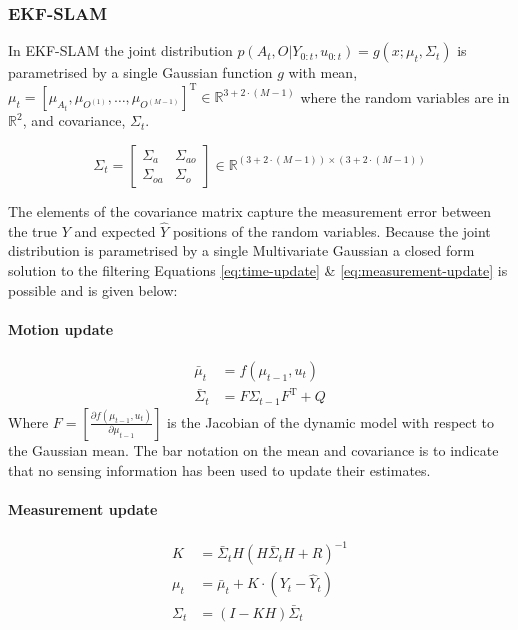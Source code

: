 \documentclass[review]{elsarticle}
\numberwithin{equation}{section}
\begin{document}
\subsubsection{EKF-SLAM}\label{sec:EKF-SLAM}

In EKF-SLAM the joint distribution $p(A_{t},O|Y_{0:t},u_{0:t}) = g(x;\mu_t,\Sigma_t)$ is parametrised by a single Gaussian function $g$ with mean,
$\mu_t = \left[\mu_{A_{t}},\mu_{O^{(1)}},\dots,\mu_{O^{(M-1)}}\right]^{\mathrm{T}} \in \mathbb{R}^{3 + 2\cdot (M-1)}$  where the random variables 
are in $\mathbb{R}^2$, and covariance, $\Sigma_t$. 

\begin{equation}
\Sigma_t = \begin{bmatrix}
       \Sigma_a & \Sigma_{ao}  \\[0.3em]
       \Sigma_{oa} & \Sigma_o
     \end{bmatrix}
     \in \mathbb{R}^{(3 + 2\cdot (M-1)) \times (3 + 2\cdot (M-1))}
\end{equation}

The elements of the covariance matrix capture the measurement error between the true $Y$ and expected $\hat{Y}$ 
positions of the random variables. Because the joint distribution is parametrised by a single Multivariate Gaussian a closed 
form solution to the filtering Equations \ref{eq:time-update} \& \ref{eq:measurement-update} is possible and is given below:

\paragraph{Motion update}
\begin{align}
  \bar{\mu}_t      &= f(\mu_{t-1},u_t)\\
  \bar{\Sigma}_{t} &= F \Sigma_{t-1} F^{\mathrm{T}} + Q
\end{align}
Where $F = \left[\frac{\partial f(\mu_{t-1},u_t)}{\partial \mu_{t-1} } \right]$ is the Jacobian of the dynamic model with respect to the Gaussian mean. The 
bar notation on the mean and covariance is to indicate that no sensing information has been used to update their estimates.

\paragraph{Measurement update}

\begin{align}
   K    &= \bar{\Sigma}_{t} H (H \bar{\Sigma}_{t} H + R)^{-1} \\
  \mu_t &= \bar{\mu}_t + K \cdot (Y_t - \hat{Y}_t)\\
  \Sigma_t &= (I - KH) \bar{\Sigma}_{t}
\end{align}
 
\end{document}

